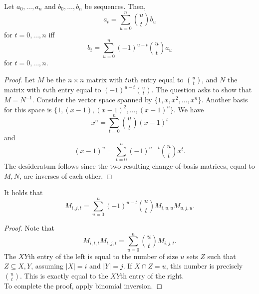 	\begin{lemma}
		Let $a_0,\ldots,a_n$ and $b_0,\ldots,b_n$ be sequences. Then,
		\[ a_t = \sum_{u=0}^{n} \binom{u}{t} b_u \]
		for $t=0,\ldots,n$ iff
		\[ b_t = \sum_{u=0}^{n} (-1)^{u-t} \binom{u}{t} a_u \]
		for $t=0,\ldots,n$.
	\end{lemma}
	\begin{proof}
		Let $M$ be the $n \times n$ matrix with $tu$th entry equal to $\binom{u}{t}$, and $N$ the matrix with $tu$th entry equal to $(-1)^{u-t} \binom{u}{t}$. The question asks to show that $M = N^{-1}$. Consider the vector space spanned by $\{1,x,x^2,\ldots,x^n\}$. Another basis for this space is $\{1,(x-1),(x-1)^2,\ldots,(x-1)^n\}$. We have
		\[ x^u = \sum_{t=0}^{n} \binom{u}{t} (x-1)^t \]
		and
		\[ (x-1)^u = \sum_{t=0}^{n} (-1)^{n-t} \binom{u}{t} x^t. \]
		The desideratum follows since the two resulting change-of-basis matrices, equal to $M,N$, are inverses of each other.
	\end{proof}

	\begin{fprop}
		\label{binom-inv-2}
		It holds that
		\[ M_{i,j,t} = \sum_{u=0}^{n} (-1)^{u-t} \binom{u}{t} M_{i,u,u} M_{u,j,u}. \]
	\end{fprop}
	\begin{proof}
		Note that
		\[ M_{i,t,t} M_{t,j,t} = \sum_{u=0}^{n} \binom{u}{t} M_{i,j,t}. \]
		The $XY$th entry of the left is equal to the number of size $u$ sets $Z$ such that $Z \subseteq X,Y$, assuming $|X|=i$ and $|Y|=j$. If $X \cap Z = u$, this number is precisely $\binom{u}{t}$. This is exactly equal to the $XY$th entry of the right. \\
		To complete the proof, apply binomial inversion.
	\end{proof}

